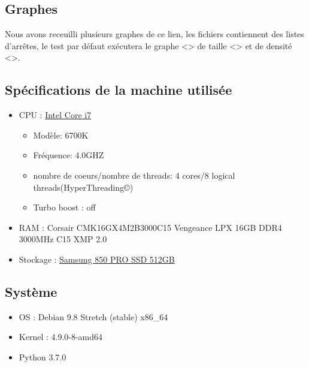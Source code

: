 \documentclass{report}
\begin{document}
\subsection{Graphes}
Nous avons receuilli plusieurs graphes de ce \label{site}{lien}, les fichiers contiennent des listes
d'arrêtes, le test par défaut exécutera le graphe <> de taille <> et de densité <>.
\newpage
\subsection{Spécifications de la machine utilisée}
    \begin{itemize}[label=$\bullet$]
      \item CPU :
      \href{https://ark.intel.com/products/88195/Intel-Core-i7-6700K-Processor-8M-Cache-up-to-4_20-GHz}
        {Intel Core i7}
        \begin{itemize}[label=$\ast$]
          \item Modèle: 6700K
          \item Fréquence: 4.0GHZ
          \item nombre de coeurs/nombre de threads: 4 cores/8 logical threads(HyperThreading©)
          \item Turbo boost : off
        \end{itemize}
      \item RAM : Corsair CMK16GX4M2B3000C15 Vengeance LPX 16GB DDR4 3000MHz C15 XMP 2.0
      \item Stockage : \href{http://downloadcenter.samsung.com/content/UM/201711/20171115103115156/Samsung_SSD_850_PRO_Data_Sheet_Rev_3.pdf}
          {Samsung 850 PRO SSD 512GB}
    \end{itemize}
    \subsection{Système}
      \begin{itemize}[label=$\bullet$]
      \item OS : Debian 9.8 Stretch (stable) x86\_64
      \item Kernel :  4.9.0-8-amd64
      \item Python 3.7.0
    \end{itemize}
\end{document}
